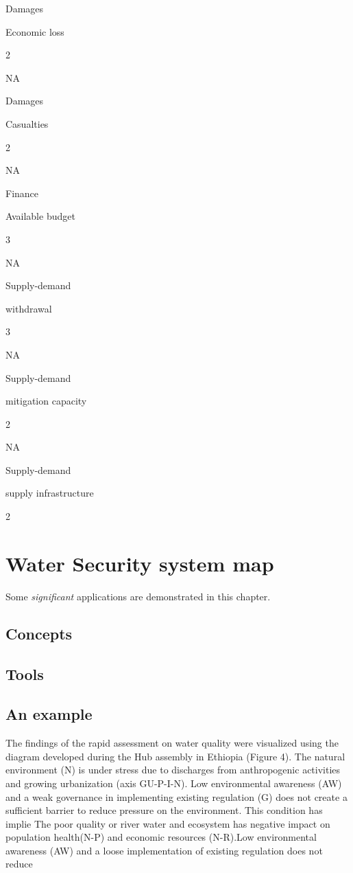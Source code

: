 \documentclass[
]{book}
\begin{document}
Damages

Economic loss

2

NA

Damages

Casualties

2

NA

Finance

Available budget

3

NA

Supply-demand

withdrawal

3

NA

Supply-demand

mitigation capacity

2

NA

Supply-demand

supply infrastructure

2

\hypertarget{water-security-system-map}{%
\chapter{Water Security system map}\label{water-security-system-map}}

Some \emph{significant} applications are demonstrated in this chapter.

\hypertarget{concepts-3}{%
\section{Concepts}\label{concepts-3}}

\hypertarget{tools-3}{%
\section{Tools}\label{tools-3}}

\hypertarget{an-example-2}{%
\section{An example}\label{an-example-2}}

The findings of the rapid assessment on water quality were visualized using the diagram developed during the Hub assembly in Ethiopia (Figure 4). The natural environment (N) is under stress due to discharges from anthropogenic activities and growing urbanization (axis GU-P-I-N). Low environmental awareness (AW) and a weak governance in implementing existing regulation (G) does not create a sufficient barrier to reduce pressure on the environment. This condition has implie The poor quality or river water and ecosystem has negative impact on population health(N-P) and economic resources (N-R).Low environmental awareness (AW) and a loose implementation of existing regulation does not reduce
\end{document}
